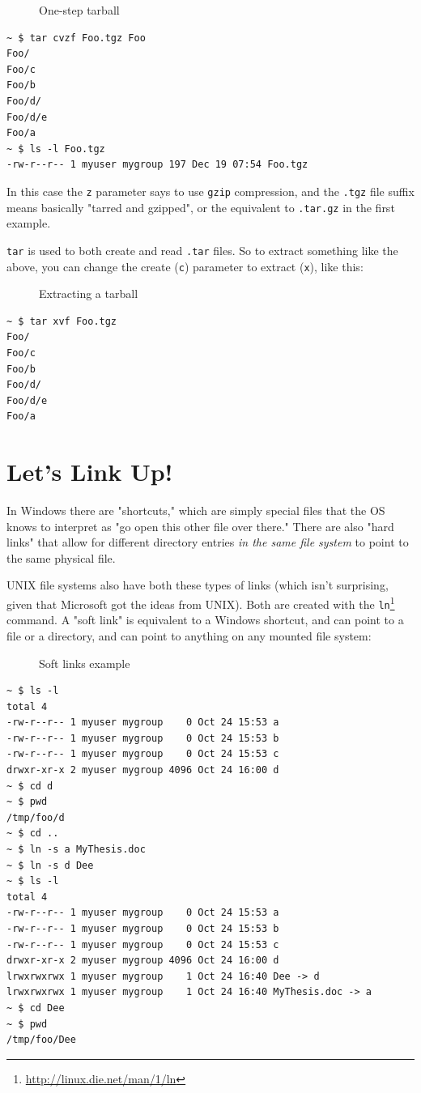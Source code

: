 \documentclass[10pt,]{book}
\renewcommand{\href}[2]{#2\footnote{\url{#1}}}
\numberwithin{figure}{chapter}
\DeclareRobustCommand{\drcap}[1]{\begin{figure}[H]\caption{#1}\end{figure}}
\DeclareRobustCommand{\drcmd}[1]{\index{Commands!#1}}
\begin{document}
\drcap{One-step tarball}

\begin{verbatim}
~ $ tar cvzf Foo.tgz Foo
Foo/
Foo/c
Foo/b
Foo/d/
Foo/d/e
Foo/a
~ $ ls -l Foo.tgz 
-rw-r--r-- 1 myuser mygroup 197 Dec 19 07:54 Foo.tgz
\end{verbatim}

In this case the \texttt{z} parameter says to use \texttt{gzip}
compression, and the \texttt{.tgz} file suffix means basically "tarred
and gzipped", or the equivalent to \texttt{.tar.gz} in the first
example.

\texttt{tar} is used to both create and read \texttt{.tar} files. So to
extract something like the above, you can change the create (\texttt{c})
parameter to extract (\texttt{x}), like this:

\drcap{Extracting a tarball}

\begin{verbatim}
~ $ tar xvf Foo.tgz 
Foo/
Foo/c
Foo/b
Foo/d/
Foo/d/e
Foo/a
\end{verbatim}

\section*{Let's Link Up!}\label{lets-link-up}

In Windows there are "shortcuts," which are simply special files that
the OS knows to interpret as "go open this other file over there." There
are also "hard links" that allow for different directory entries
\emph{in the same file system} to point to the same physical file.

UNIX file systems also have both these types of links (which isn't
surprising, given that Microsoft got the ideas from UNIX). Both are
created with the
\href{http://linux.die.net/man/1/ln}{\texttt{ln}}\drcmd{ln} command. A
"soft link" is equivalent to a Windows shortcut, and
can point to a file or a directory, and can point to anything on any
mounted file system:

\drcap{Soft links example}

\begin{verbatim}
~ $ ls -l
total 4
-rw-r--r-- 1 myuser mygroup    0 Oct 24 15:53 a
-rw-r--r-- 1 myuser mygroup    0 Oct 24 15:53 b
-rw-r--r-- 1 myuser mygroup    0 Oct 24 15:53 c
drwxr-xr-x 2 myuser mygroup 4096 Oct 24 16:00 d
~ $ cd d
~ $ pwd
/tmp/foo/d
~ $ cd ..
~ $ ln -s a MyThesis.doc
~ $ ln -s d Dee
~ $ ls -l
total 4
-rw-r--r-- 1 myuser mygroup    0 Oct 24 15:53 a
-rw-r--r-- 1 myuser mygroup    0 Oct 24 15:53 b
-rw-r--r-- 1 myuser mygroup    0 Oct 24 15:53 c
drwxr-xr-x 2 myuser mygroup 4096 Oct 24 16:00 d
lrwxrwxrwx 1 myuser mygroup    1 Oct 24 16:40 Dee -> d
lrwxrwxrwx 1 myuser mygroup    1 Oct 24 16:40 MyThesis.doc -> a
~ $ cd Dee
~ $ pwd
/tmp/foo/Dee
\end{verbatim}
\end{document}

